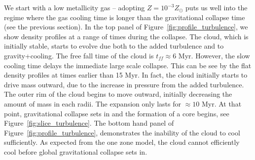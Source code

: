 \documentclass[useAMS,usenatbib]{mn2e}
\begin{document}
We start with a low metallicity gas -- adopting $Z=10^{-3}Z_\odot$ puts us well into the regime
where the gas cooling time is longer than the gravitational collapse time (see the previous section).
In the top panel of Figure~\ref{fig:profile_turbulence}, we show density profiles at a range of times during
the collapse.  The cloud, which is initially stable, starts to evolve due both to the added
turbulence and to gravity+cooling. The free fall time of the cloud is $t_{ff}\approx 6$
Myr.  However, the slow cooling time delays the immediate large scale collapse.
This can be see by the flat density profiles at times earlier than 15 Myr. 
In fact, the cloud initially starts to drive mass outward, due to the increase in pressure 
from the added turbulence. The outer rim
of the cloud begins to move outward, initially decreasing the amount of mass in each radii.
The expansion only lasts for $\approx 10$ Myr. At that point, gravitational
collapse sets in and the formation of a core begins, see Figure~\ref{fig:slice_turbulence}. The bottom
hand panel of Figure~\ref{fig:profile_turbulence}, demonstrates the inability of the cloud to cool
sufficiently. As expected from the one zone model, the cloud cannot efficiently
cool before global gravitational collapse sets in.
\end{document}
